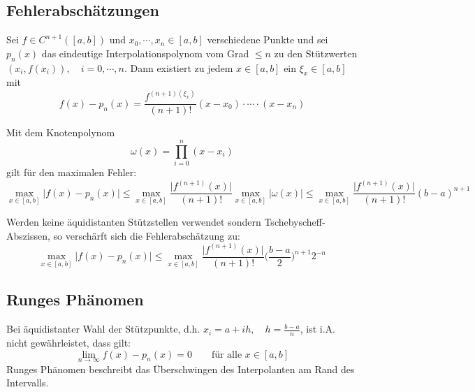 \documentclass[a4paper, 11pt, accentcolor = tud3b]{tudreport}
\newcommand{\abs}[1]{\ensuremath{{\lvert #1 \rvert}}}
\begin{document}
	        \subsection{Fehlerabschätzungen}
	            Sei \( f \in C^{n+1}([a, b]) \) und \( x_0, \cdots, x_n \in [a, b] \) verschiedene Punkte und sei \( p_n(x) \) das eindeutige Interpolationspolynom vom Grad \( \leq n \) zu den Stützwerten \( (x_i, f(x_i)), \quad i = 0, \cdots, n \). Dann existiert zu jedem \( x \in [a, b] \) ein \( \xi_x \in [a, b] \) mit
	            \begin{equation*}
		            f(x) - p_n(x) = \frac{f^{(n + 1)(\xi_x)}}{(n + 1)!} (x - x_0) \cdot \cdots \cdot (x - x_n)
	            \end{equation*}
	            
	            Mit dem Knotenpolynom \[ \omega(x) = \prod_{i = 0}^n (x - x_i) \] gilt für den maximalen Fehler:
	            \begin{equation*}
		            \max_{x \in [a, b]} \abs{f(x) - p_n(x)} \leq \max_{x \in [a, b]} \frac{\abs{f^{(n + 1)}(x)}}{(n + 1)!} \max_{x \in [a, b]} \abs{\omega(x)} \leq \max_{x \in [a, b]} \frac{\abs{f^{(n + 1)}(x)}}{(n + 1)!} (b - a)^{n+1}
	            \end{equation*}
	            
	            Werden keine äquidistanten Stützstellen verwendet sondern Tschebyscheff-Abszissen, so verschärft sich die Fehlerabschätzung zu:
	            \begin{equation*}
		            \max_{ x \in [a,b] } \abs{f(x) - p_n(x)} \leq \max_{x \in [a, b]} \frac{\abs{f^{(n+1)}(x)}}{(n + 1)!} \Bigg(\frac{b-a}{2}\Bigg)^{n+1} 2^{-n}
	            \end{equation*}
	
	        \subsection{Runges Phänomen}
	            Bei äquidistanter Wahl der Stützpunkte, d.h. \( x_i = a + ih, \quad h = \frac{b - a}{n} \), ist i.A. nicht gewährleistet, dass gilt:
	            \begin{equation*}
		            \lim\limits_{n \rightarrow \infty} f(x) - p_n(x) = 0 \qquad \textrm{für alle } x \in [a, b]
	            \end{equation*}
	            Runges Phänomen beschreibt das Überschwingen des Interpolanten am Rand des Intervalls.
	
\end{document}
